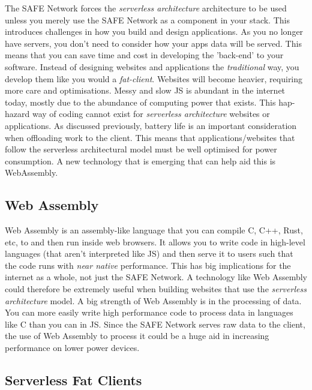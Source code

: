 The SAFE Network forces the \textit{serverless architecture} architecture to be used unless you merely use the SAFE Network as a component in your stack. This introduces challenges in how you build and design applications. As you no longer have servers, you don't need to consider how your apps data will be served. This means that you can save time and cost in developing the 'back-end' to your software. Instead of designing websites and applications the \textit{traditional} way, you develop them like you would a \textit{fat-client}. Websites will become heavier, requiring more care and optimisations. Messy and slow JS is abundant in the internet today, mostly due to the abundance of computing power that exists. This hap-hazard way of coding cannot exist for \textit{serverless architecture} websites or applications. As discussed previously, battery life is an important consideration when offloading work to the client. This means that applications/websites that follow the serverless architectural model must be well optimised for power consumption. A new technology that is emerging that can help aid this is WebAssembly.

\subsection{Web Assembly}

Web Assembly is an assembly-like language that you can compile C, C++, Rust, etc, to and then run inside web browsers. It allows you to write code in high-level languages (that aren't interpreted like JS) and then serve it to users such that the code runs with \textit{near native} performance. This has big implications for the internet as a whole, not just the SAFE Network. A technology like Web Assembly could therefore be extremely useful when building websites that use the \textit{serverless architecture} model. A big strength of Web Assembly is in the processing of data. You can more easily write high performance code to process data in languages like C than you can in JS. Since the SAFE Network serves raw data to the client, the use of Web Assembly to process it could be a huge aid in increasing performance on lower power devices.

\subsection{Serverless Fat Clients}

